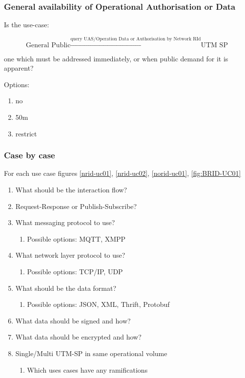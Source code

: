 \documentclass{ua_wgs_base}
\begin{document}
\subsubsection{General availability of Operational Authorisation or Data\label{subsec:availability-of-operational}}

Is the use-case: 

\[
\text{General Public}\ensuremath{\xrightarrow{\text{query UAS/Operation Data or Authorisation by Network RId}}}\text{UTM SP}
\]
 

one which must be addressed immediately, or when public demand for
it is apparent?

Options: 
\begin{enumerate}
\item no
\item 50m
\item restrict
\end{enumerate}

\subsubsection{Case by case}

For each use case figures \ref{nrid-uc01}, \ref{nrid-uc02}, \ref{norid-uc01},
\ref{fig:BRID-UC01}
\begin{enumerate}
\item What should be the interaction flow?
\item Request-Response or Publish-Subscribe?
\item What messaging protocol to use?
\begin{enumerate}
\item Possible options: MQTT, XMPP
\end{enumerate}
\item What network layer protocol to use?
\begin{enumerate}
\item Possible options: TCP/IP, UDP
\end{enumerate}
\item What should be the data format?
\begin{enumerate}
\item Possible options: JSON, XML, Thrift, Protobuf
\end{enumerate}
\item What data should be signed and how?
\item What data should be encrypted and how? 
\item Single/Multi UTM-SP in same operational volume
\begin{enumerate}
\item Which uses cases have any ramifications
\end{enumerate}
\end{enumerate}
\end{document}
